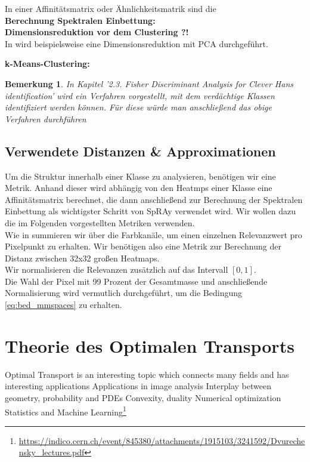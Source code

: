 \documentclass[11pt,a4paper]{article}
\newtheorem{remark}[theorem]{Bemerkung}
\numberwithin{equation}{section}
\begin{document}
	In einer Affinitätsmatrix oder Ähnlichkeitsmatrik sind die \\
	
	\noindent \textbf{Berechnung Spektralen Einbettung:}\\
	
	\noindent \textbf{Dimensionsreduktion vor dem Clustering ?!}\\
	
	In \cite{AC} wird beispielsweise eine Dimensionsreduktion mit PCA durchgeführt.
	
	\noindent \textbf{k-Means-Clustering:}\\
	\begin{remark}
		In \cite{imagenet_unhansed_v1} Kapitel '2.3. Fisher Discriminant Analysis for Clever Hans
		identification' wird ein Verfahren vorgestellt, mit dem verdächtige Klassen identifiziert werden können. Für diese würde man anschließend das obige Verfahren durchführen
	\end{remark}
	\subsection{Verwendete Distanzen \& Approximationen}
	Um die Struktur innerhalb einer Klasse zu analysieren, benötigen wir eine Metrik.
	Anhand dieser wird abhängig von den Heatmps einer Klasse eine Affinitätsmatrix berechnet, die dann anschließend zur Berechnung der Spektralen Einbettung als wichtigster Schritt von SpRAy verwendet wird. Wir wollen dazu die im Folgenden vorgestellten Metriken verwenden.\\
	Wie in \cite{imagenet_unhansed_v1} summieren wir über die Farbkanäle, um einen einzelnen Relevanzwert pro Pixelpunkt zu erhalten. Wir benötigen also eine Metrik zur Berechnung der Distanz zwischen 32x32 großen Heatmaps.\\
	Wir normalisieren die Relevanzen zusätzlich auf das Intervall $[0,1]$.\\
	Die Wahl der Pixel mit 99 Prozent der Gesamtmasse und anschließende Normalisierung wird vermutlich durchgeführt, um die Bedingung \autoref{eq:bed_mmspaces} zu erhalten.
	\section{Theorie des Optimalen Transports}
	
	Optimal Transport is an interesting topic which connects many fields and has
	interesting applications
	Applications in image analysis
	Interplay between geometry, probability and PDEs
	Convexity, duality
	Numerical optimization
	Statistics and Machine Learning\footnote{\url{https://indico.cern.ch/event/845380/attachments/1915103/3241592/Dvurechensky_lectures.pdf}}
	
\end{document}
